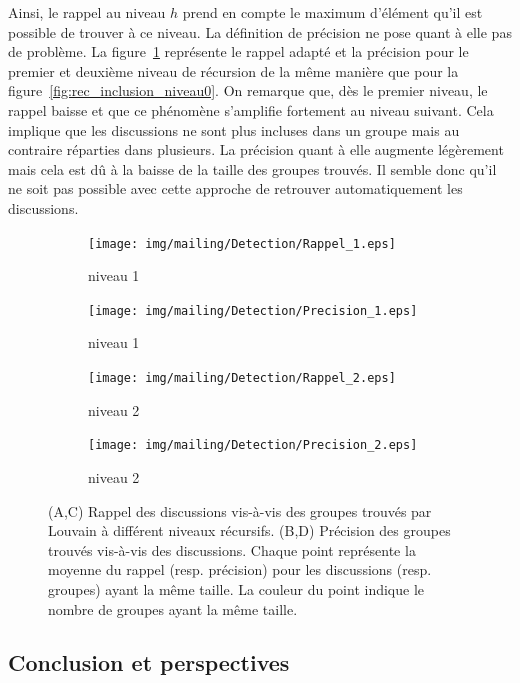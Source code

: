 Ainsi, le rappel au niveau $h$ prend en compte le maximum d'élément qu'il est possible de trouver à ce niveau.
La définition de précision ne pose quant à elle pas de problème.
La figure~\ref{fig:rec_inclusion} représente le rappel adapté et la précision pour le premier et deuxième niveau de récursion de la même manière que pour la figure~\ref{fig:rec_inclusion_niveau0}.
On remarque que, dès le premier niveau, le rappel baisse et que ce phénomène s'amplifie fortement au niveau suivant.
Cela implique que les discussions ne sont plus incluses dans un groupe mais au contraire réparties dans plusieurs.
La précision quant à elle augmente légèrement mais cela est dû à la baisse de la taille des groupes trouvés.
Il semble donc qu'il ne soit pas possible avec cette approche de retrouver automatiquement les discussions.


\begin{figure} [h]
\centering

	\begin{subfigure}{0.45\textwidth}
		\texttt{[image: img/mailing/Detection/Rappel\_1.eps]}
		\caption{niveau 1}		
	\end{subfigure}
	\begin{subfigure}{0.45\textwidth}
		\texttt{[image: img/mailing/Detection/Precision\_1.eps]}
		\caption{niveau 1}		
	\end{subfigure}
	
	\begin{subfigure}{0.45\textwidth}
		\texttt{[image: img/mailing/Detection/Rappel\_2.eps]}
		\caption{niveau 2}		
	\end{subfigure}
	\begin{subfigure}{0.45\textwidth}
		\texttt{[image: img/mailing/Detection/Precision\_2.eps]}
		\caption{niveau 2}		
	\end{subfigure}

\caption{(A,C) Rappel des discussions vis-à-vis des groupes trouvés par Louvain à différent niveaux récursifs.
(B,D) Précision des groupes trouvés vis-à-vis des discussions.
Chaque point représente la moyenne du rappel (resp. précision) pour les discussions (resp. groupes) ayant la même taille.
La couleur du point indique le nombre de groupes ayant la même taille.
}
\label{fig:rec_inclusion}
\end{figure}

\subsection{Conclusion et perspectives}

